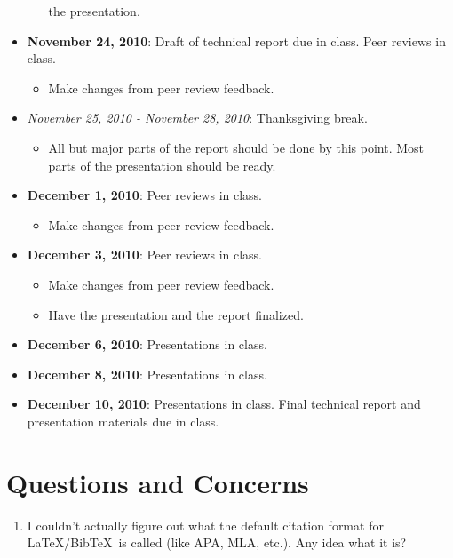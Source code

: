 \documentclass[12pt]{article}
\newcommand{\bibtex}{{\sc Bib}\TeX\ }
\begin{document}
\begin{itemize}
\begin{itemize}
    the presentation.
    \end{itemize}
\item \textbf{November 24, 2010}: Draft of technical report due in
class.  Peer reviews in class.
    \begin{itemize}
    \item Make changes from peer review feedback.
    \end{itemize}
\item \textit{November 25, 2010 - November 28, 2010}: Thanksgiving break.
    \begin{itemize}
    \item All but major parts of the report should be done by this
    point. Most parts of the presentation should be ready.
    \end{itemize}
\item \textbf{December 1, 2010}: Peer reviews in class.
    \begin{itemize}
    \item Make changes from peer review feedback.
    \end{itemize}
\item \textbf{December 3, 2010}: Peer reviews in class.
    \begin{itemize}
    \item Make changes from peer review feedback.
    \item Have the presentation and the report finalized.
    \end{itemize}
\item \textbf{December 6, 2010}: Presentations in class.
\item \textbf{December 8, 2010}: Presentations in class.
\item \textbf{December 10, 2010}: Presentations in class.  Final
technical report and presentation materials due in class.
\end{itemize}

\section{Questions and Concerns}
\label{question-section}
\begin{enumerate}
\item I couldn't actually figure out what the default citation format
for \LaTeX/\bibtex is called (like APA, MLA, etc.).  Any idea what it
is? \label{citation-question}
\end{enumerate}
\nocite{*}


\label{refs}
\end{document}
